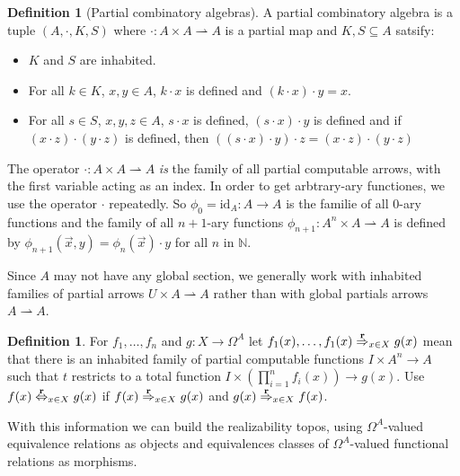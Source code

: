 \documentclass{amsart}
\theoremstyle{plain}
\theoremstyle{definition}
\newtheorem{defin}[theorem]{Definition}
\newcommand\id{\mathrm{id}}
\begin{document}
\newcommand\partar\rightharpoonup
\begin{defin}[Partial combinatory algebras] A partial combinatory algebra is a tuple $(A,\cdot,K,S)$ where $\cdot: A\times A \partar A$ is a partial map and $K, S\subseteq A$ satsify:
\begin{itemize}
\item $K$ and $S$ are inhabited.
\item For all $k\in K$, $x,y\in A$, $k\cdot x$ is defined and $(k\cdot x)\cdot y = x$.
\item For all $s\in S$, $x,y,z\in A$, $s\cdot x$ is defined, $(s\cdot x)\cdot y$ is defined and if $(x\cdot z)\cdot (y\cdot z)$ is defined, then $((s\cdot x)\cdot y)\cdot z = (x\cdot z)\cdot (y\cdot z)$
\end{itemize}
\end{defin}

The operator $\cdot:A\times A\partar A$ \emph{is} the family of all partial computable arrows, with the first variable acting as an index. In order to get arbtrary-ary functiones, we use the operator $\cdot$ repeatedly. So $\phi_0 = \id_A:A\to A$ is the familie of all $0$-ary functions and the family of all $n+1$-ary functions $\phi_{n+1}: A^n\times A \partar A$ is defined by $\phi_{n+1}(\vec x,y) = \phi_n(\vec x)\cdot y$ for all $n$ in $\mathbb N$.

Since $A$ may not have any global section, we generally work with inhabited families of partial arrows $U\times A\partar A$ rather than with global partials arrows $A\partar A$.

\newcommand\pow{\Omega^}
\newcommand\rmodels{\stackrel{\mathrel{\bf r}}\Rightarrow}
\newcommand\requiv{\stackrel{\mathrel{\bf r}}\Leftrightarrow}
\begin{defin} For $f_1,\dotsc, f_n$ and $g:X\to \pow A$ let $f_1(x),\dotsc,f_1(x)\rmodels_{x\in X}g(x)$ mean that there is an inhabited family of partial computable functions $I\times A^n \to A$ such that $t$ restricts to a total function $I\times (\prod_{i=1}^n f_i(x)) \to g(x)$. Use $f(x)\requiv_{x\in X}g(x)$ if $f(x)\rmodels_{x\in X} g(x)$ and $g(x)\rmodels_{x\in X} f(x)$.
\end{defin}

With this information we can build the realizability topos, using $\pow A$-valued equivalence relations as objects and equivalences classes of $\pow A$-valued functional relations as morphisms.
\end{document}
